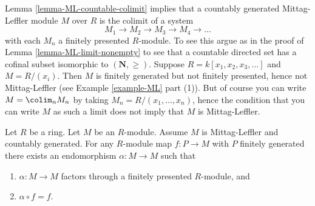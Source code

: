 \noindent
Lemma \ref{lemma-ML-countable-colimit}
implies that a countably generated Mittag-Leffler module $M$ over
$R$ is the colimit of a system
$$
M_1 \to M_2 \to M_3 \to M_4 \to \ldots
$$
with each $M_n$ a finitely presented $R$-module. To see this argue as in the
proof of
Lemma \ref{lemma-ML-limit-nonempty}
to see that a countable directed set has a cofinal
subset isomorphic to $(\mathbf{N}, \geq)$. Suppose
$R = k[x_1, x_2, x_3, \ldots]$ and $M = R/(x_i)$. Then $M$ is finitely
generated but not finitely presented, hence not Mittag-Leffler (see
Example \ref{example-ML} part (1)).
But of course you can write $M = \colim_n M_n$ by taking
$M_n = R/(x_1, \ldots, x_n)$, hence the condition that you can write
$M$ as such a limit does not imply that $M$ is Mittag-Leffler.

\begin{lemma}
\label{lemma-ML-countable}
Let $R$ be a ring.
Let $M$ be an $R$-module.
Assume $M$ is Mittag-Leffler and countably generated.
For any $R$-module map $f : P \to M$ with $P$ finitely generated there
exists an endomorphism $\alpha : M \to M$ such that
\begin{enumerate}
\item $\alpha : M \to M$ factors through a finitely presented $R$-module, and
\item $\alpha \circ f = f$.
\end{enumerate}
\end{lemma}

